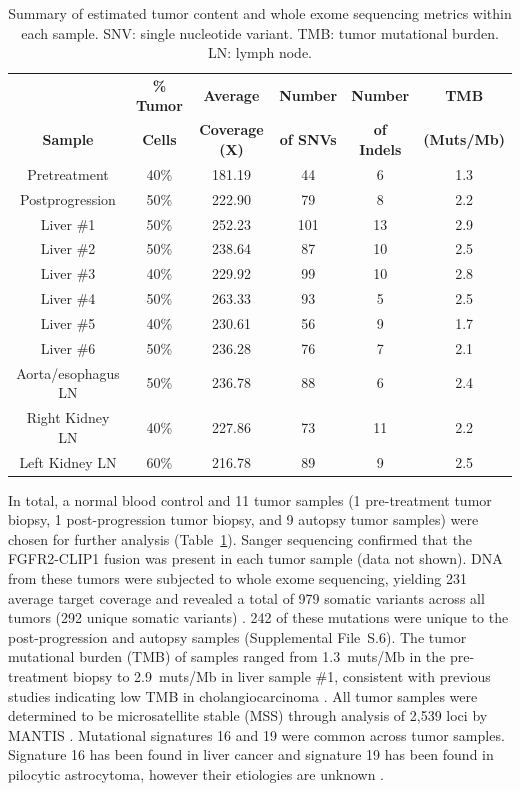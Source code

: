 \begin{table}[htbp]
    \centering
    {\small
    \begin{tabular}{cccccc}
         & \textbf{\% Tumor} & \textbf{Average} & \textbf{Number} & \textbf{Number} & \textbf{TMB} \\
        \textbf{Sample} & \textbf{Cells} & \textbf{Coverage (X)} & \textbf{of SNVs} & \textbf{of Indels} & \textbf{(Muts/Mb)} \\
        \hline
        Pretreatment & 40\%  & 181.19 & 44    & 6     & 1.3 \\
        Postprogression & 50\%  & 222.90 & 79    & 8     & 2.2 \\
        Liver \#1 & 50\%  & 252.23 & 101   & 13    & 2.9 \\
        Liver \#2 & 50\%  & 238.64 & 87    & 10    & 2.5 \\
        Liver \#3 & 40\%  & 229.92 & 99    & 10    & 2.8 \\
        Liver \#4 & 50\%  & 263.33 & 93    & 5     & 2.5 \\
        Liver \#5 & 40\%  & 230.61 & 56    & 9     & 1.7 \\
        Liver \#6 & 50\%  & 236.28 & 76    & 7     & 2.1 \\
        Aorta/esophagus LN & 50\%  & 236.78 & 88    & 6     & 2.4 \\
        Right Kidney LN & 40\%  & 227.86 & 73    & 11    & 2.2 \\
        Left Kidney LN & 60\%  & 216.78 & 89    & 9     & 2.5 \\
    \end{tabular}}
    \caption[Tumor content and WES metrics for each tumor sample sequenced.]{Summary of estimated tumor content and whole exome sequencing metrics within each sample. SNV: single nucleotide variant. TMB: tumor mutational burden. LN: lymph node.}
    \label{table:240:wes}
\end{table}
In total, a normal blood control and 11 tumor samples (1 pre-treatment tumor biopsy, 1 post-progression tumor biopsy, and 9 autopsy tumor samples) were chosen for further analysis (Table~\ref{table:240:wes}). Sanger sequencing confirmed that the FGFR2-CLIP1 fusion was present in each tumor sample (data not shown). DNA from these tumors were subjected to whole exome sequencing, yielding 231\texttimes{} average target coverage and revealed a total of 979 somatic variants across all tumors (292 unique somatic variants) \cite{samorodnitsky2015_hyb_amplicon}. 242 of these mutations were unique to the post-progression and autopsy samples (Supplemental File~S\thechapter{}.6). The tumor mutational burden (TMB) of samples ranged from 1.3~muts/Mb in the pre-treatment biopsy to 2.9~muts/Mb in liver sample \#1, consistent with previous studies indicating low TMB in cholangiocarcinoma \cite{chalmers2017,nakamura2015}. All tumor samples were determined to be microsatellite stable (MSS) through analysis of 2,539 loci by MANTIS \cite{kautto17}. Mutational signatures 16 and 19 were common across tumor samples. Signature 16 has been found in liver cancer and signature 19 has been found in pilocytic astrocytoma, however their etiologies are unknown \cite{cosmic_ms}.

